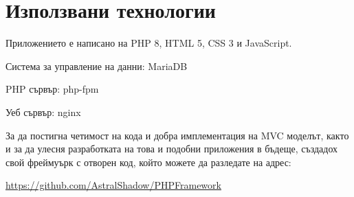 
\section{Използвани технологии}
Приложението е написано на PHP 8,
HTML 5, CSS 3 и JavaScript.

Система за управление на данни: MariaDB

PHP сървър: php-fpm

Уеб сървър: nginx

За да постигна четимост на кода и добра имплементация
на MVC моделът, както и за да улесня разработката на
това и подобни приложения в бъдеще, създадох свой
фреймуърк с отворен код, който можете да разледате
на адрес:

\href{https://github.com/AstralShadow/PHPFramework}
     {https://github.com/AstralShadow/PHPFramework}

